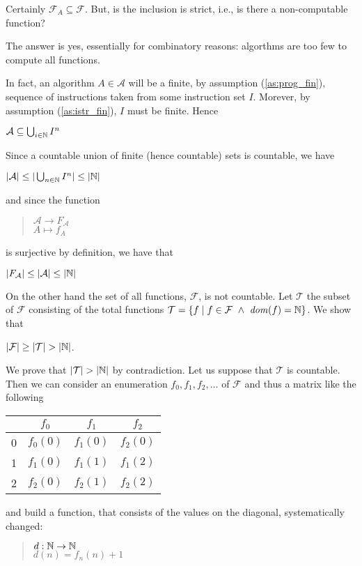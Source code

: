   Certainly $\mathcal{F}_A \subseteq \mathcal{F}$. But, is the inclusion
  is strict, i.e., is there a non-computable function?

  The answer is yes, essentially for combinatory reasons: algorthms are
  too few to compute all functions.


  In fact, an algorithm $A \in \mathcal{A}$ will be a finite, by
  assumption (\ref{as:prog_fin}), sequence of instructions taken from
  some instruction set $I$. Morever, by assumption (\ref{as:istr_fin}),
  $I$ must be finite. Hence
  \begin{center}
    $\mathcal{A} \subseteq \bigcup_{i \in \mathbb{N}} I^n$
  \end{center}
  Since  a countable union of finite (hence countable) sets is countable, we have
  \begin{center}
    $|\mathcal{A}| \leq |\bigcup_{n\in\mathbb{N}} I^n| \leq |\mathbb{N}|$
  \end{center}
  and since the function
  \begin{quote}
    $\mathcal{A} \to F_\mathcal{A}$\\
    $A \mapsto f_A$
  \end{quote}
  is surjective by definition, we have that
  \begin{center}
    $|F_\mathcal{A}| \leq |\mathcal{A}| \leq |\mathbb{N}|$
  \end{center}

  On the other hand the set of all functions, $\mathcal{F}$, is not countable. Let $\mathcal{T}$ the subset of $\mathcal{F}$ consisting of the total functions $\mathcal{T} = \{ f \mid f \in \mathcal{F}\ \land\ \mathit{dom}({f}) = \mathbb{N}\}$. We show that
  \begin{center}
    $|\mathcal{F}| \geq |\mathcal{T}| > |\mathbb{N}|$.
  \end{center}

  We prove that $|\mathcal{T}| > |\mathbb{N}|$ by contradiction. Let us suppose that $\mathcal{T}$ is countable. Then we can consider an enumeration $f_0, f_1, f_2, \ldots$ of $\mathcal{F}$ and thus a matrix like the following
  \begin{center}
    \begin{tabular}{c|ccc}
      & $f_0$    & $f_1$    & $f_2$\\ 
      \hline
      0 & $f_0(0)$ & $f_1(0)$ & $f_2(0)$ \\
      1 & $f_1(0)$ & $f_1(1)$ & $f_1(2)$ \\
      2 & $f_2(0)$ & $f_2(1)$ & $f_2(2)$
    \end{tabular}
  \end{center}
  and build a function, that consists of the values on the diagonal, systematically changed:
  \begin{quote}
    $d: \mathbb{N} \to \mathbb{N}$\\  
    $d(n) = f_n(n)+1$
  \end{quote}

